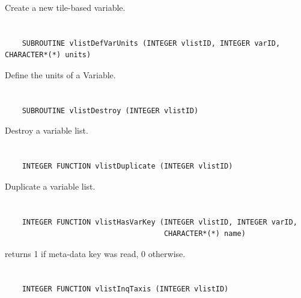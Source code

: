 Create a new tile-based variable.


\section*{\tt {}}

\begin{verbatim}
    SUBROUTINE vlistDefVarUnits (INTEGER vlistID, INTEGER varID, CHARACTER*(*) units)
\end{verbatim}

Define the units of a Variable.


\section*{\tt {}}

\begin{verbatim}
    SUBROUTINE vlistDestroy (INTEGER vlistID)
\end{verbatim}

Destroy a variable list.


\section*{\tt {}}

\begin{verbatim}
    INTEGER FUNCTION vlistDuplicate (INTEGER vlistID)
\end{verbatim}

Duplicate a variable list.


\section*{\tt {}}

\begin{verbatim}
    INTEGER FUNCTION vlistHasVarKey (INTEGER vlistID, INTEGER varID,
                                     CHARACTER*(*) name)
\end{verbatim}

returns 1 if meta-data key was read, 0 otherwise.


\section*{\tt {}}

\begin{verbatim}
    INTEGER FUNCTION vlistInqTaxis (INTEGER vlistID)
\end{verbatim}

